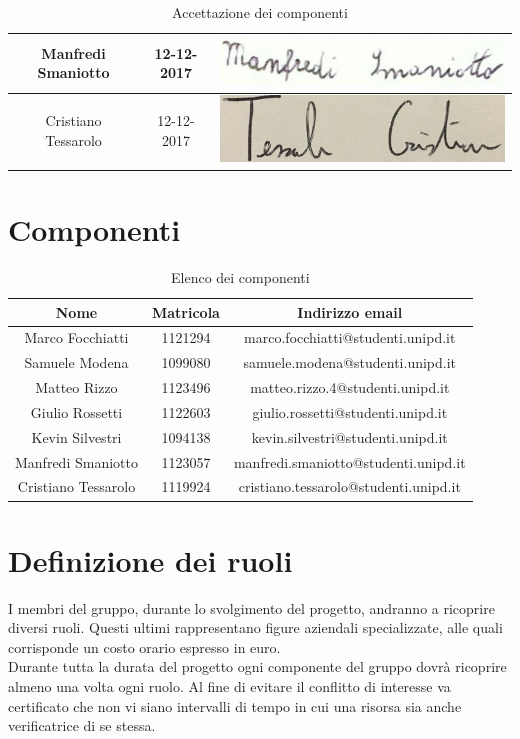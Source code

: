 \documentclass[./PianodiProgetto.tex]{subfiles}
\begin{document}
\begin{table}[H]
\begin{tabular}{|c|c|c|}
		Manfredi Smaniotto& 12-12-2017 &\includegraphics[scale=0.5]{img/firme/SmaniottoManfredi} \\ \hline
		Cristiano Tessarolo& 12-12-2017 &\includegraphics[scale=0.5]{img/firme/TessaroloCristiano} \\  
		\hline
	\end{tabular}
	\caption{Accettazione dei componenti}
\end{table}

\section{Componenti}
\begin{table}[H]
	\begin{tabular}{|c|c|c|}
	\hline
	Nome&Matricola&Indirizzo email \\ \hline
	Marco Focchiatti&1121294&marco.focchiatti@studenti.unipd.it  \\ \hline
	Samuele Modena&1099080&samuele.modena@studenti.unipd.it \\ \hline
	Matteo Rizzo&1123496&matteo.rizzo.4@studenti.unipd.it \\ \hline
	Giulio Rossetti&1122603&giulio.rossetti@studenti.unipd.it \\ \hline
	Kevin Silvestri&1094138&kevin.silvestri@studenti.unipd.it \\ \hline
	Manfredi Smaniotto&1123057&manfredi.smaniotto@studenti.unipd.it \\ \hline
	Cristiano Tessarolo&1119924&cristiano.tessarolo@studenti.unipd.it \\  
	\hline
	\end{tabular}
\caption{Elenco dei componenti}
\end{table}

\newpage

\section{Definizione dei ruoli}
I membri del gruppo, durante lo svolgimento del progetto, andranno a ricoprire diversi ruoli. Questi ultimi rappresentano figure aziendali specializzate, alle quali corrisponde un costo orario espresso in euro. \\
Durante tutta la durata del progetto ogni componente del gruppo dovrà ricoprire almeno una volta ogni ruolo. Al fine di evitare il conflitto di interesse va certificato che non vi siano intervalli di tempo in cui una risorsa sia anche verificatrice di se stessa.
\end{document}
